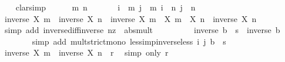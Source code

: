 \begin{isabellebody}
\ \ \isamarkupfalse%
\ clarsimp\isanewline
\ \ \ \ \isamarkupfalse%
\ m\ n\isanewline
\ \ \ \ \isamarkupfalse%
\ {\isacharasterisk}{\kern0pt}{\isacharcolon}{\kern0pt}\ {\isachardoublequoteopen}i\ {\isasymle}\ m{\isachardoublequoteclose}\ {\isachardoublequoteopen}j\ {\isasymle}\ m{\isachardoublequoteclose}\ {\isachardoublequoteopen}i\ {\isasymle}\ n{\isachardoublequoteclose}\ {\isachardoublequoteopen}j\ {\isasymle}\ n{\isachardoublequoteclose}\isanewline
\ \ \ \ \isamarkupfalse%
\ {\isachardoublequoteopen}{\isasymbar}inverse\ {\isacharparenleft}{\kern0pt}X\ m{\isacharparenright}{\kern0pt}\ {\isacharminus}{\kern0pt}\ inverse\ {\isacharparenleft}{\kern0pt}X\ n{\isacharparenright}{\kern0pt}{\isasymbar}\ {\isacharequal}{\kern0pt}\ inverse\ {\isasymbar}X\ m{\isasymbar}\ {\isacharasterisk}{\kern0pt}\ {\isasymbar}X\ m\ {\isacharminus}{\kern0pt}\ X\ n{\isasymbar}\ {\isacharasterisk}{\kern0pt}\ inverse\ {\isasymbar}X\ n{\isasymbar}{\isachardoublequoteclose}\isanewline
\ \ \ \ \ \ \isamarkupfalse%
\ {\isacharparenleft}{\kern0pt}simp\ add{\isacharcolon}{\kern0pt}\ inverse{\isacharunderscore}{\kern0pt}diff{\isacharunderscore}{\kern0pt}inverse\ nz\ {\isacharasterisk}{\kern0pt}\ abs{\isacharunderscore}{\kern0pt}mult{\isacharparenright}{\kern0pt}\isanewline
\ \ \ \ \isamarkupfalse%
\ \isamarkupfalse%
\ {\isachardoublequoteopen}{\isasymdots}\ {\isacharless}{\kern0pt}\ inverse\ b\ {\isacharasterisk}{\kern0pt}\ s\ {\isacharasterisk}{\kern0pt}\ inverse\ b{\isachardoublequoteclose}\isanewline
\ \ \ \ \ \ \isamarkupfalse%
\ {\isacharparenleft}{\kern0pt}simp\ add{\isacharcolon}{\kern0pt}\ mult{\isacharunderscore}{\kern0pt}strict{\isacharunderscore}{\kern0pt}mono\ less{\isacharunderscore}{\kern0pt}imp{\isacharunderscore}{\kern0pt}inverse{\isacharunderscore}{\kern0pt}less\ i\ j\ b\ {\isacharasterisk}{\kern0pt}\ s{\isacharparenright}{\kern0pt}\isanewline
\ \ \ \ \isamarkupfalse%
\ \isamarkupfalse%
\ {\isachardoublequoteopen}{\isasymbar}inverse\ {\isacharparenleft}{\kern0pt}X\ m{\isacharparenright}{\kern0pt}\ {\isacharminus}{\kern0pt}\ inverse\ {\isacharparenleft}{\kern0pt}X\ n{\isacharparenright}{\kern0pt}{\isasymbar}\ {\isacharless}{\kern0pt}\ r{\isachardoublequoteclose}\ \isamarkupfalse%
\ {\isacharparenleft}{\kern0pt}simp\ only{\isacharcolon}{\kern0pt}\ r{\isacharparenright}{\kern0pt}\isanewline
\ \ \isamarkupfalse%
\isanewline
\ \ \isamarkupfalse%
\ \isamarkupfalse%

\end{isabellebody}
